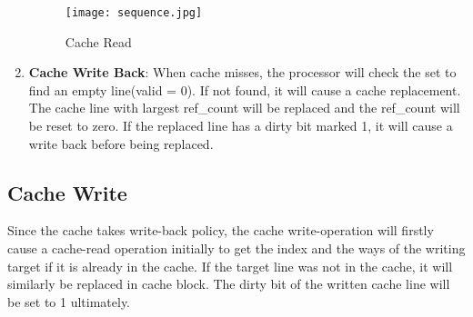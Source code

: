 \documentclass[paper=a4, fontsize=11pt]{scrartcl} %
\numberwithin{equation}{section} %
\numberwithin{figure}{section} %
\numberwithin{table}{section} %
\begin{document}
\begin{enumerate}
    \begin{figure}[!ht]
    \centering
    \texttt{[image: sequence.jpg]}
    \caption{Cache Read}
    \label{fig:read seq}
    \end{figure}
\item \textbf{Cache Write Back}: When cache misses, the processor will check the set to find an empty line(valid = 0). If not found, it will cause a cache replacement. The cache line with largest ref\_count will be replaced and the ref\_count will be reset to zero. If the replaced line has a dirty bit marked 1, it will cause a write back before being replaced.
\end{enumerate}

\subsection{Cache Write}
Since the cache takes write-back policy, the cache write-operation will firstly cause a cache-read operation initially to get the index and the ways of the writing target if it is already in the cache. If the target line was not in the cache, it will similarly be replaced in cache block. The dirty bit of the written cache line will be set to 1 ultimately.
\end{document}
